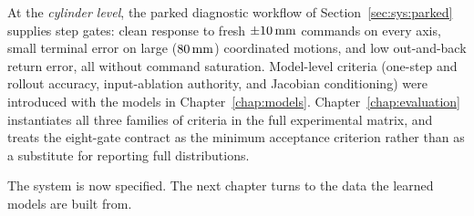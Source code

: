 At the \emph{cylinder level}, the parked diagnostic workflow of
Section~\ref{sec:sys:parked} supplies step gates: clean response to
fresh $\pm\unit[10]{mm}$ commands on every axis, small terminal error on
large ($\unit[80]{mm}$) coordinated motions, and low out-and-back return
error, all without command saturation. Model-level criteria
(one-step and rollout accuracy, input-ablation authority, and Jacobian
conditioning) were introduced with the models in
Chapter~\ref{chap:models}. Chapter~\ref{chap:evaluation} instantiates
all three families of criteria in the full experimental matrix, and
treats the eight-gate contract as the minimum acceptance criterion
rather than as a substitute for reporting full distributions.

The system is now specified. The next chapter turns to the data the learned
models are built from.
